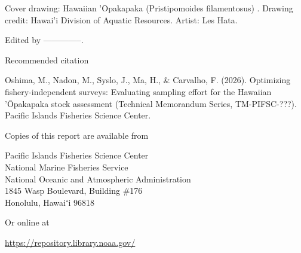 \documentclass[
  letterpaper,
  12pt,
  letterpaper]{report}
\begin{document}
{\fontsize{12pt}{14pt}\selectfont Cover drawing: Hawaiian 'Ōpakapaka \fontsize{12pt}{14pt}\selectfont(Pristipomoides filamentosus) \fontsize{12pt}{14pt}\selectfont. Drawing credit: Hawai'i Division of Aquatic Resources. Artist: Les Hata.\par}
\vspace{0.25cm}

{\fontsize{12pt}{14pt}\selectfont Edited by --------------.\par}
\vspace{0.5cm}


{\fontsize{14pt}{16pt}\selectfont Recommended citation\par}
\vspace{0.25cm}

{\fontsize{12pt}{14pt}\selectfont Oshima, M., Nadon, M., Syslo, J., Ma, H., \& Carvalho, F. (2026). Optimizing fishery-independent surveys: Evaluating sampling effort for the Hawaiian 'Ōpakapaka stock assessment (Technical Memorandum Series, TM-PIFSC-???). Pacific Islands Fisheries Science Center.\par}
\vspace{0.5cm}

{\fontsize{14pt}{16pt}\selectfont Copies of this report are available from\par}
\vspace{0.25cm}

{\fontsize{12pt}{14pt}\selectfont
Pacific Islands Fisheries Science Center\\
National Marine Fisheries Service\\
National Oceanic and Atmospheric Administration\\
1845 Wasp Boulevard, Building \#176\\
Honolulu, Hawaiʻi 96818\par}
\vspace{0.5cm}



{\fontsize{14pt}{16pt}\selectfont Or online at\par}
\vspace{0.25cm}

{\fontsize{12pt}{14pt}\selectfont \href{https://repository.library.noaa.gov/}{\color{blue}\underline{https://repository.library.noaa.gov/}}\par}
\end{document}
